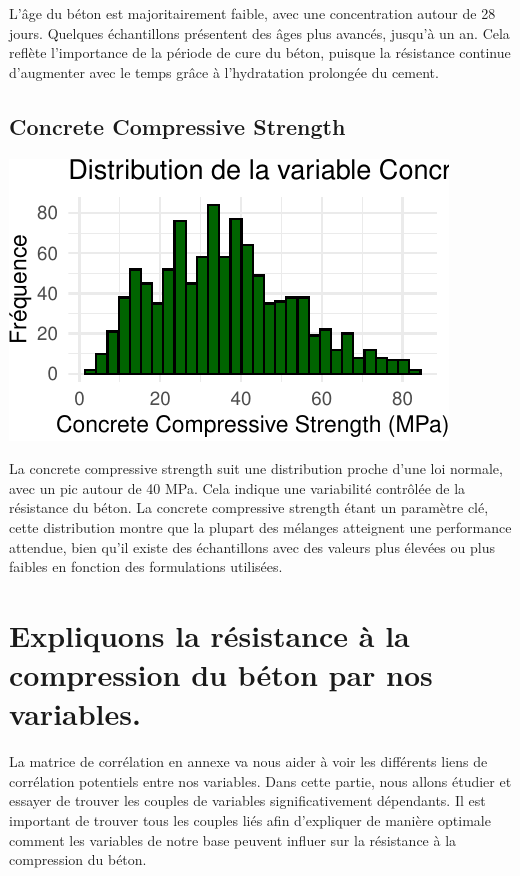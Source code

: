 \documentclass[
  12pt,
]{article}
\begin{document}
L'âge du béton est majoritairement faible, avec une concentration autour
de 28 jours. Quelques échantillons présentent des âges plus avancés,
jusqu'à un an. Cela reflète l'importance de la période de cure du béton,
puisque la résistance continue d'augmenter avec le temps grâce à
l'hydratation prolongée du cement.

\subsection{Concrete Compressive
Strength}\label{concrete-compressive-strength}

\begin{center}\includegraphics{rmd_final_files/figure-latex/unnamed-chunk-8-1} \end{center}

La concrete compressive strength suit une distribution proche d'une loi
normale, avec un pic autour de 40 MPa. Cela indique une variabilité
contrôlée de la résistance du béton. La concrete compressive strength
étant un paramètre clé, cette distribution montre que la plupart des
mélanges atteignent une performance attendue, bien qu'il existe des
échantillons avec des valeurs plus élevées ou plus faibles en fonction
des formulations utilisées.

\section{Expliquons la résistance à la compression du béton par nos
variables.}\label{expliquons-la-ruxe9sistance-uxe0-la-compression-du-buxe9ton-par-nos-variables.}

La matrice de corrélation en annexe va nous aider à voir les différents
liens de corrélation potentiels entre nos variables. Dans cette partie,
nous allons étudier et essayer de trouver les couples de variables
significativement dépendants. Il est important de trouver tous les
couples liés afin d'expliquer de manière optimale comment les variables
de notre base peuvent influer sur la résistance à la compression du
béton.
\end{document}
